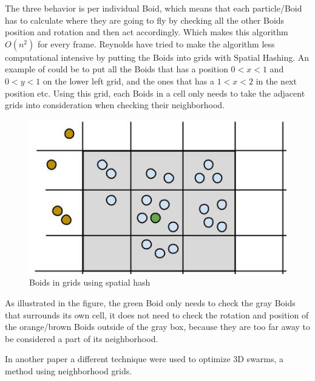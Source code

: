 The three behavior is per individual Boid, which means that each particle/Boid has to calculate where they are going to fly by checking all the other Boids position and rotation and then act accordingly. Which makes this algorithm $ O(n^2)$ for every frame. 
Reynolds have tried to make the algorithm less computational intensive by putting the Boids into grids with Spatial Hashing. An example of could be to put all the Boids that has a position $0<x<1$ and $0<y<1$ on the lower left grid, and the ones that has a $1<x<2$ in the next position etc. Using this grid, each Boids in a cell only needs to take the adjacent grids into consideration when checking their neighborhood. 
\begin{figure}[h!]
    \centering
    \includegraphics[width=0.8\linewidth]{images/boid_spatialhash}
    \caption{Boids in grids using spatial hash} \label{fig:spatialhash}
\end{figure}
As illustrated in the figure, the green Boid only needs to check the gray Boids that surrounds its own cell, it does not need to check the rotation and position of the orange/brown Boids outside of the gray box, because they are too far away to be considered a part of its neighborhood.

In another paper a different technique were used to optimize 3D swarms, a method using neighborhood grids.\\

